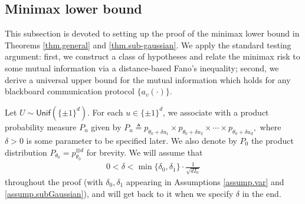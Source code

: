 \documentclass[final,12pt]{colt2018} %
\def \bE {\mathbb{E}}
\begin{document}
%

\subsection{Minimax lower bound}
This subsection is devoted to setting up the proof of the minimax lower bound in Theorems \ref{thm.general} and \ref{thm.sub-gaussian}. We apply the standard testing argument: first, we construct a class of hypotheses and relate the minimax risk to some mutual information via a distance-based Fano's inequality; second, we derive a universal upper bound for the mutual information which holds for any blackboard communication protocol $\{a_v(\cdot)\}$. 

Let $U\sim \mathsf{Unif}(\{ \pm 1\}^d)$. For each $u\in \{\pm 1\}^d$, we associate with a product probability measure $P_u$ given by
$
P_u \triangleq p_{\theta_0+\delta u_1}\times p_{\theta_0+\delta u_2} \times \cdots \times p_{\theta_0+\delta u_d}, 
$
where $\delta>0$ is some parameter to be specified later. We also denote by $P_0$ the product distribution $P_{\theta_0} = p_{\theta_0}^{\otimes d}$ for brevity. We will assume that
\begin{align}\label{eq.condition}
0<\delta <\min\{\delta_0, \delta_1\}\cdot\frac{1}{\sqrt{dI_0}}
\end{align}
throughout the proof (with $\delta_0, \delta_1$ appearing in Assumptions \ref{assump.var} and \ref{assump.subGaussian}), and will get back to it when we specify $\delta$ in the end. 
\end{document}
